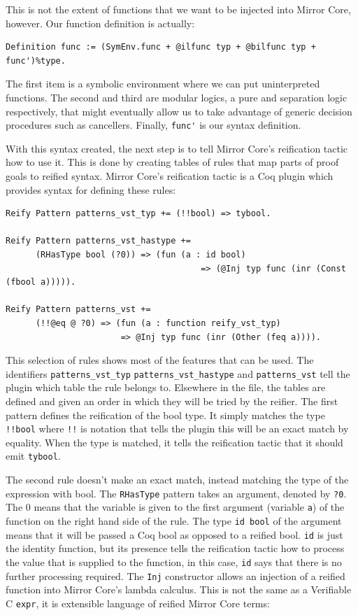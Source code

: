\documentclass{puthesis}
\begin{document}
This is not the extent of functions that we want to be injected into
Mirror Core, however. Our function definition is actually:

\begin{lstlisting}
Definition func := (SymEnv.func + @ilfunc typ + @bilfunc typ + func')%type.
\end{lstlisting}

The first item is a symbolic environment where we can put
uninterpreted functions. The second and third are modular logics, a
pure and separation logic respectively, 
that might eventually allow us to take advantage of generic decision
procedures such as cancellers. Finally, \lstinline|func'| is our syntax definition.

With this syntax created, the next step is to tell Mirror Core's
reification tactic how to use it. This is done by creating tables of
rules that map parts of proof goals to reified syntax. Mirror Core's
reification tactic is a Coq plugin which provides syntax for defining
these rules:

\begin{lstlisting}
Reify Pattern patterns_vst_typ += (!!bool) => tybool.

Reify Pattern patterns_vst_hastype += 
      (RHasType bool (?0)) => (fun (a : id bool) 
                                       => (@Inj typ func (inr (Const (fbool a))))).

Reify Pattern patterns_vst += 
      (!!@eq @ ?0) => (fun (a : function reify_vst_typ) 
                       => @Inj typ func (inr (Other (feq a)))).
\end{lstlisting}

This selection of rules shows most of the features that can be
used. The identifiers \lstinline|patterns_vst_typ| \lstinline|patterns_vst_hastype| and
\lstinline|patterns_vst| tell the plugin which table the rule belongs
to. Elsewhere in the file, the tables are defined and given an order
in which they will be tried by the reifier. The first pattern defines the
reification of the bool type. It simply matches the type
\lstinline|!!bool| where \lstinline|!!| is notation that tells the
plugin this will be an exact match by equality. When the type is
matched, it tells the reification tactic that it should emit
\lstinline|tybool|.

The second rule doesn't make an exact match, instead matching the type
of the expression with bool. The \lstinline|RHasType| pattern takes an
argument, denoted by \lstinline|?0|. The 0 means that the variable is
given to the first argument (variable \lstinline|a|) of the function
on the right hand side of the rule. The type \lstinline|id bool| of
the argument means that it will be passed a Coq bool as opposed to a
reified bool. \lstinline|id| is just the identity function, but its
presence tells the reification tactic how to process the value that is
supplied to the function, in this case, \lstinline|id| says that there
is no further processing required.  The \lstinline|Inj| constructor
allows an injection of a reified function into Mirror Core's lambda
calculus. This is not the same as a Verifiable C \lstinline|expr|, it
is extensible language of reified Mirror Core terms:
\end{document}
